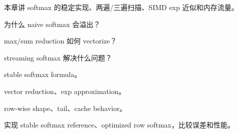 {本章讲 softmax 的稳定实现、两遍/三遍扫描、SIMD exp 近似和内存流量。}
{\item 为什么 naive softmax 会溢出？
\item max/sum reduction 如何 vectorize？
\item streaming softmax 解决什么问题？}
{\item stable softmax formula。
\item vector reduction、exp approximation。
\item row-wise shape、tail、cache behavior。}
{实现 stable softmax reference、optimized row softmax，比较误差和性能。}
